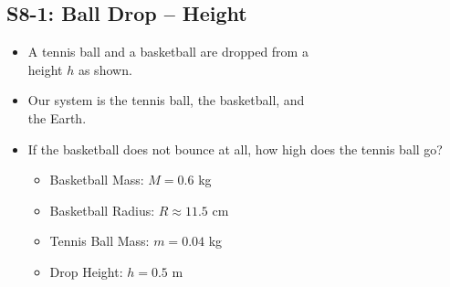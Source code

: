 \documentclass[]{article}
\begin{document}
\begin{PresentSpace}
\vspace{-10pt}
\section*{S8-1: Ball Drop -- Height}
\vspace{-10pt}
\begin{itemize}
	\item A tennis ball and a basketball are dropped from a \\
	height $h$ as shown.
	\item Our system is the tennis ball, the basketball, and \\
	the Earth.
	\item If the basketball does not bounce at all, how high does the tennis ball go?
	\begin{itemize}
		\item Basketball Mass: $M=0.6$ kg
		\item Basketball Radius: $R \approx 11.5$ cm
		\item Tennis Ball Mass: $m=0.04$ kg
		\item Drop Height: $h=0.5$ m
	\end{itemize}
\end{itemize}
\end{PresentSpace}
\newpage
\end{document}
